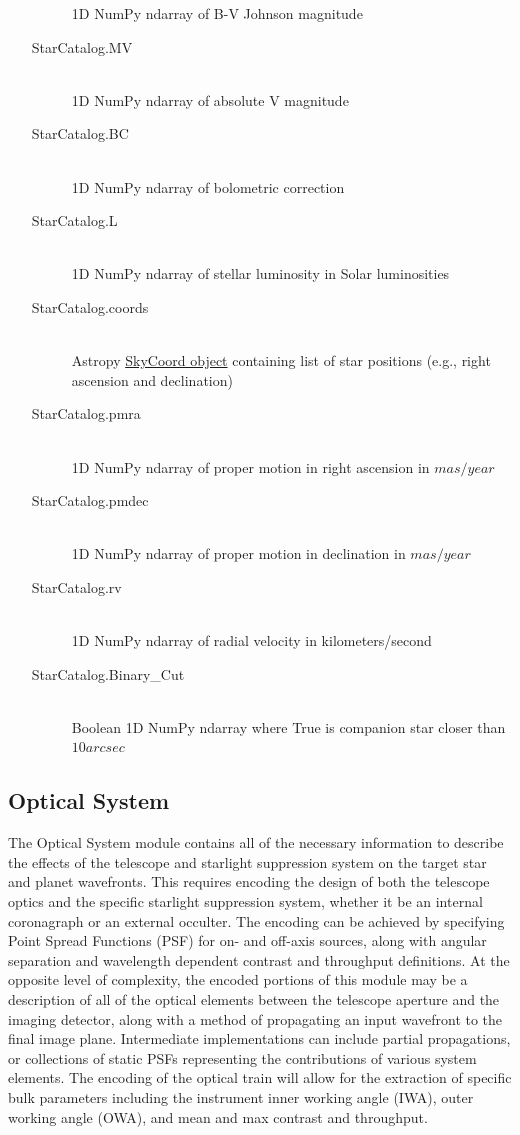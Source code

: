 \documentclass[cleanfoot]{asme2ej}
\begin{document}
\begin{itemize}
\begin{description}
        1D NumPy ndarray of B-V Johnson magnitude
        \item[StarCatalog.MV] \hfill \\
        1D NumPy ndarray of absolute V magnitude
        \item[StarCatalog.BC] \hfill \\
        1D NumPy ndarray of bolometric correction
        \item[StarCatalog.L] \hfill \\
        1D NumPy ndarray of stellar luminosity in Solar luminosities
        \item[StarCatalog.coords] \hfill \\
        Astropy \href{http://astropy.readthedocs.org/en/latest/api/astropy.coordinates.SkyCoord.html}{SkyCoord object} containing list of star positions (e.g., right ascension and declination)
        \item[StarCatalog.pmra] \hfill \\
        1D NumPy ndarray of proper motion in right ascension in $ mas/year $
        \item[StarCatalog.pmdec] \hfill \\
        1D NumPy ndarray of proper motion in declination in $ mas/year $
        \item[StarCatalog.rv] \hfill \\
        1D NumPy ndarray of radial velocity in kilometers/second
        \item[StarCatalog.Binary\_Cut] \hfill \\
        Boolean 1D NumPy ndarray where True is companion star closer than $ 10 arcsec $
    \end{description}
\end{itemize}

\subsection{Optical System}
The Optical System module contains all of the necessary information to describe the effects of the telescope and starlight suppression system on the target star and planet wavefronts.  This requires encoding the design of both the telescope optics and the specific starlight suppression system, whether it be an internal coronagraph or an external occulter.  The encoding can be achieved by specifying Point Spread Functions (PSF) for on- and off-axis sources, along with angular separation and wavelength dependent contrast and throughput definitions.  At the opposite level of complexity, the encoded portions of this module may be a description of all of the optical elements between the telescope aperture and the imaging detector, along with a method of propagating an input wavefront to the final image plane.  Intermediate implementations can include partial propagations, or collections of static PSFs representing the contributions of various system elements.  The encoding of the optical train will allow for the extraction of specific bulk parameters including the instrument inner working angle (IWA), outer working angle (OWA), and mean and max contrast and throughput.
\end{document}
